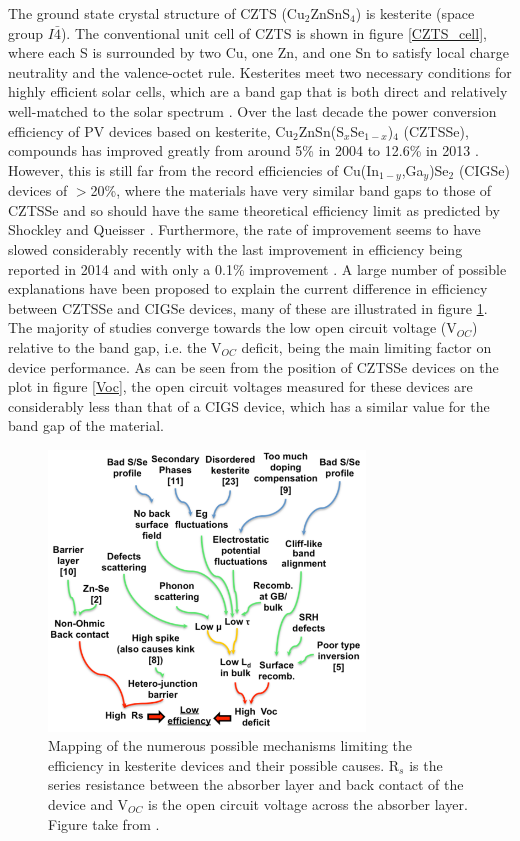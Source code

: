 The ground state crystal structure of CZTS (Cu$_{2}$ZnSnS$_{4}$) is kesterite (space group $I\bar{4}$). The conventional unit cell of CZTS is shown in figure \ref{CZTS_cell}, where each S is surrounded by two Cu, one Zn, and one Sn to satisfy local charge neutrality and the valence-octet rule.
Kesterites meet two necessary conditions for highly efficient solar cells, which are a band gap that is both direct and relatively well-matched to the solar spectrum \cite{CZTS_book}.
Over the last decade the power conversion efficiency of PV devices based on kesterite, Cu$_2$ZnSn(S$_x$Se$_{1-x}$)$_4$ (CZTSSe), compounds has improved greatly from around 5\% in 2004 to 12.6\% in 2013 \cite{culprit_2}. However, this is still far from the record efficiencies of Cu(In$_{1-y}$,Ga$_y$)Se$_2$ (CIGSe) devices of $>$20\%, where the materials have very similar band gaps to those of CZTSSe \cite{culprit} and so should have the same theoretical efficiency limit as predicted by Shockley and Queisser \cite{SQ_1961}. Furthermore, the rate of improvement seems to have slowed considerably recently with the last improvement in efficiency being reported in 2014 and with only a 0.1\% improvement \cite{culprit_3}. A large number of possible explanations have been proposed to explain the current difference in efficiency between CZTSSe and CIGSe devices, many of these are illustrated in figure \ref{kesterite_bottlenecks}. The majority of studies converge towards the low open circuit voltage (V$_{OC}$) relative to the band gap, i.e. the V$_{OC}$ deficit, being the main limiting factor on device performance. As can be seen from the position of CZTSSe devices on the plot in figure \ref{Voc}, the open circuit voltages measured for these devices are considerably less than that of a CIGS device, which has a similar value for the band gap of the material.\\

\begin{figure}[h!]
  \centering
    \includegraphics[width=0.75\textwidth]{figures/kesterite_bottlenecks.png}
    \caption{Mapping of the numerous possible mechanisms limiting the efficiency in kesterite devices and their possible causes. R$_s$ is the series resistance between the absorber layer and back contact of the device and V$_{OC}$ is the open circuit voltage across the absorber layer. Figure take from .}
  \label{kesterite_bottlenecks}
\end{figure}

